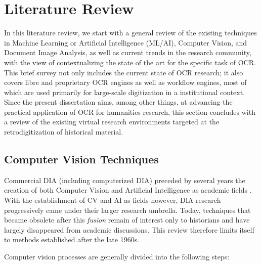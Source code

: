 \section{Literature Review}

In this literature review, we start with a general review of the existing
techniques in Machine Learning or Artificial Intelligence (ML/AI), Computer
Vision, and Document Image Analysis, as well as current trends in the research
community, with the view of contextualizing the state of the art for the
specific task of OCR. This brief survey not only includes the current state of
OCR research; it also covers libre and proprietary OCR engines as well as
workflow engines, most of which are used primarily for large-scale digitization
in a institutional context. Since the present dissertation aims, among other
things, at advancing the practical application of OCR for humanities research,
this section concludes with a review of the existing virtual research
environments targeted at the retrodigitization of historical material.

\subsection{Computer Vision Techniques}
\label{ss:techniques}

Commercial DIA (including computerized DIA) preceded by several years the
creation of both Computer Vision and Artificial Intelligence as academic fields
\cite[pg. 11-14]{herbert1982history}. With the establishment of CV and AI as
fields however, DIA research progressively came under their larger research
umbrella. Today, techniques that became obsolete after this \emph{fusion}
remain of interest only to historians and have largely disappeared from
academic discussions. This review therefore limits itself to methods
established after the late 1960s.

Computer vision processes are generally divided into the following steps: 

